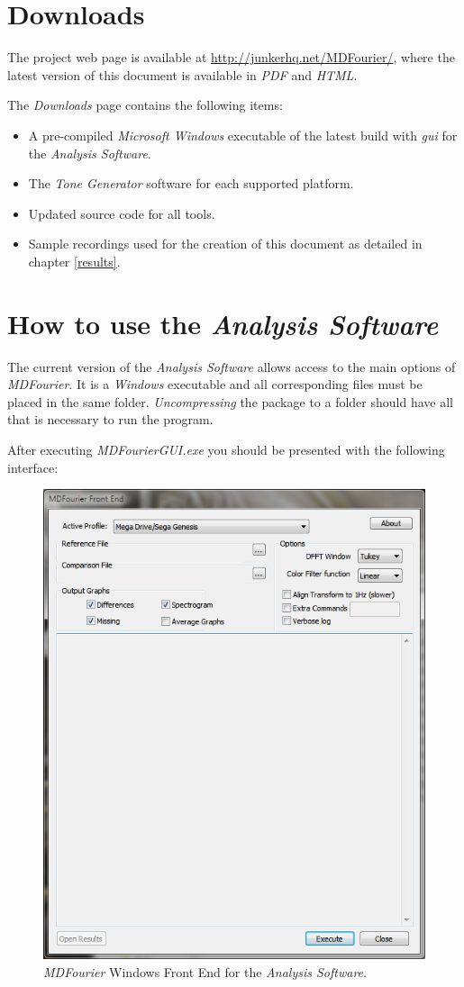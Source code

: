\documentclass[10pt,a4paper]{report}
\newcommand{\ac}[1]{\textit{\acrshort{#1}}}
\begin{document}
\begin{appendices}
	
\chapter{Downloads}
\label{downloads}

The project web page is available at \url{http://junkerhq.net/MDFourier/}, where the latest version of this document is available in \textit{PDF} and \textit{HTML}.

The \textit{Downloads} page contains the following items:
\begin{itemize}
	\item A pre-compiled \textit{Microsoft Windows} executable of the latest build with \ac{gui} for the \textit{Analysis Software}.
	\item The \textit{Tone Generator} software for each supported platform.
	\item Updated source code for all tools.
	\item Sample recordings used for the creation of this document as detailed in chapter \ref{results}.
\end{itemize}
	
\chapter{How to use the \textit{Analysis Software}}
\label{usinggui}
The current version of the \textit{Analysis Software} allows access to the main options of \textit{MDFourier}. It is a \textit{Windows} executable and all corresponding files must be placed in the same folder. \textit{Uncompressing} the package to a folder should have all that is necessary to run the program.

After executing \textit{MDFourierGUI.exe} you should be presented with the following interface:

\begin{figure}[H]
	\centering
	\includegraphics[width=0.6\linewidth]{images/GUI/GUI1.png}
	\caption[Front End]{\textit{MDFourier} Windows Front End for the \textit{Analysis Software}.}
	\label{fig:gui1}
\end{figure}


\end{appendices}
\end{document}
